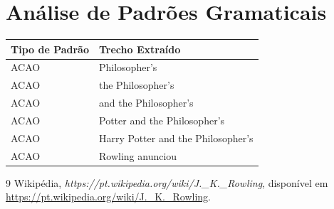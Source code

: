 \documentclass{article}
\begin{document}
\section{Análise de Padrões Gramaticais}
\begin{table}[h]
\centering
\begin{tabular}{|l|p{8cm}|}
\hline
\textbf{Tipo de Padrão} & \textbf{Trecho Extraído} \\ \hline
ACAO & Philosopher’s \\ \hline
ACAO & the Philosopher’s \\ \hline
ACAO & and the Philosopher’s \\ \hline
ACAO & Potter and the Philosopher’s \\ \hline
ACAO & Harry Potter and the Philosopher’s \\ \hline
ACAO & Rowling anunciou \\ \hline

\end{tabular}
\end{table}

\clearpage

\begin{thebibliography}{9}
 Wikipédia, \textit{https://pt.wikipedia.org/wiki/J.\_K.\_Rowling}, disponível em \url{https://pt.wikipedia.org/wiki/J._K._Rowling}.
\end{thebibliography}
\end{document}
